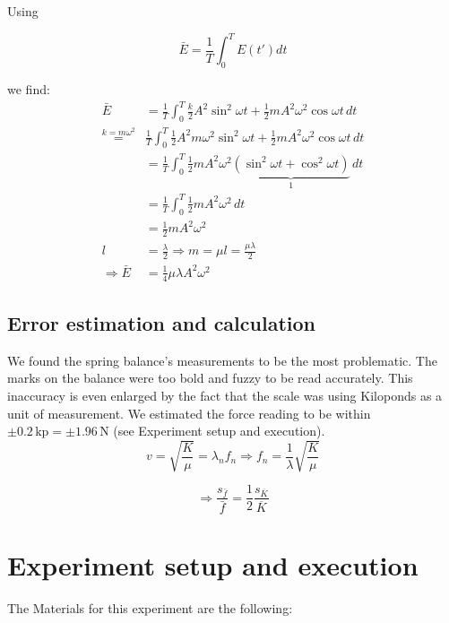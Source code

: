 \documentclass{scrreprt}
\newcommand{\unit}[1]{\ensuremath{\, \mathrm{#1}}}
\begin{document}
Using

\begin{equation}
\bar{E} = \frac{1}{T} \int_0^T{E(t') dt}
\end{equation}

we find:
\begin{align}
\bar{E} &= \frac{1}{T} \int_0^T{\frac{k}{2} A^2 \sin^2{\omega t} + \frac{1}{2} m A^2 \omega^2 \cos{\omega t}}\,dt\\
\stackrel{k=m\omega^2}{=}& \frac{1}{T} \int_0^T{\frac{1}{2} A^2 m \omega^2 \sin^2{\omega t} + \frac{1}{2} m A^2 \omega^2 \cos{\omega t}} \,dt\\
&= \frac{1}{T}\int_0^T{\frac{1}{2} m A^2 \omega^2 \underbrace{(\sin^2{\omega t}+\cos^2{\omega t})}_{1} } \,dt\\
& = \frac{1}{T}\int_0^T \! \frac{1}{2}mA^2\omega^2 \, dt\\
& =\frac{1}{2}mA^2\omega^2\\
l &= \frac{\lambda}{2} \Rightarrow m = \mu l = \frac{\mu \lambda}{2}\\ 
\Rightarrow \bar{E} &= \frac{1}{4}\mu \lambda A^2\omega^2
\end{align}

\subsection{Error estimation and calculation}
We found the spring balance's measurements to be the most problematic. The marks on the balance were too bold and fuzzy to be read accurately. This inaccuracy is even enlarged by the fact that the scale was using Kiloponds as a unit of measurement. We estimated the force reading to be within $\pm 0.2\unit{kp} = \pm 1.96 \unit{N}$ (see Experiment setup and execution).\\

\begin{equation}
v = \sqrt{\frac{K}{\mu}} = \lambda_n f_n \Rightarrow f_n = \frac{1}{\lambda} \sqrt{\frac{K}{\mu}} 
\end{equation}

\begin{equation} \label{eq:relerror}
\Rightarrow \frac{s_{\bar{f}}}{\bar{f}} = \frac{1}{2} \frac{s_{\overline{K}}}{\overline{K}}
\end{equation}

\section{Experiment setup and execution}
The Materials for this experiment are the following: 
\end{document}
